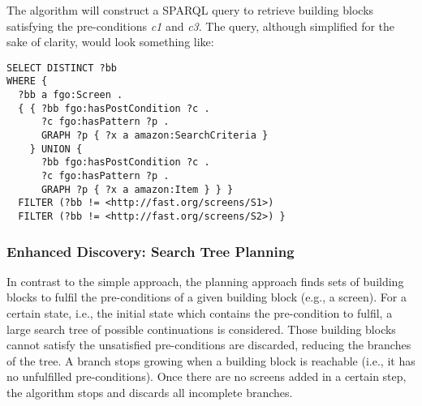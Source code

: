 The algorithm will construct a SPARQL query to retrieve building blocks satisfying the pre-conditions \emph{c1} and \emph{c3}. 
The query, although simplified for the sake of clarity, would look something like:

\begin{lstlisting}
SELECT DISTINCT ?bb 
WHERE { 
  ?bb a fgo:Screen . 
  { { ?bb fgo:hasPostCondition ?c .
      ?c fgo:hasPattern ?p .
      GRAPH ?p { ?x a amazon:SearchCriteria } 
    } UNION {
      ?bb fgo:hasPostCondition ?c .
      ?c fgo:hasPattern ?p .
      GRAPH ?p { ?x a amazon:Item } } }
  FILTER (?bb != <http://fast.org/screens/S1>) 
  FILTER (?bb != <http://fast.org/screens/S2>) }
\end{lstlisting}


\subsubsection{Enhanced Discovery: Search Tree Planning}
\label{sssec:planning}


In contrast to the simple approach, the planning approach finds sets of building blocks to fulfil the pre-conditions of a given building block (e.g., a screen). For a certain state, i.e., the initial 
state which contains the pre-condition to fulfil, a large search tree of possible continuations is considered. Those building blocks cannot satisfy the unsatisfied pre-conditions are discarded, reducing the branches of the tree. A branch stops growing when a building block is reachable (i.e., it has no unfulfilled pre-conditions). Once there are no screens 
added in a certain step, the algorithm stops and discards all incomplete branches.

